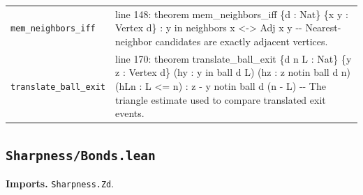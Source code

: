 \documentclass[10pt]{article}
\newcommand{\module}[1]{\texttt{#1}}
\begin{document}
\begin{longtable}{>{\raggedright\arraybackslash}p{} >{\raggedright\arraybackslash}p{}}
\texttt{mem\_\allowbreak{}neighbors\_\allowbreak{}iff} & {\ttfamily\scriptsize line 148:\allowbreak{} theorem mem\_\allowbreak{}neighbors\_\allowbreak{}iff \{d :\allowbreak{} Nat\} \{x y :\allowbreak{} Vertex d\} :\allowbreak{} y in neighbors x <-\allowbreak{}> Adj x y -\allowbreak{}-\allowbreak{} Nearest-\allowbreak{}neighbor candidates are exactly adjacent vertices.\allowbreak{}} \\[0.45em]
\texttt{translate\_\allowbreak{}ball\_\allowbreak{}exit} & {\ttfamily\scriptsize line 170:\allowbreak{} theorem translate\_\allowbreak{}ball\_\allowbreak{}exit \{d n L :\allowbreak{} Nat\} \{y z :\allowbreak{} Vertex d\} (\allowbreak{}hy :\allowbreak{} y in ball d L)\allowbreak{} (\allowbreak{}hz :\allowbreak{} z notin ball d n)\allowbreak{} (\allowbreak{}hLn :\allowbreak{} L <=\allowbreak{} n)\allowbreak{} :\allowbreak{} z -\allowbreak{} y notin ball d (\allowbreak{}n -\allowbreak{} L)\allowbreak{} -\allowbreak{}-\allowbreak{} The triangle estimate used to compare translated exit events.\allowbreak{}} \\[0.45em]
\end{longtable}

\subsection*{\module{Sharpness/Bonds.lean}}
\textbf{Imports.} \module{Sharpness.Zd}.
\end{document}
